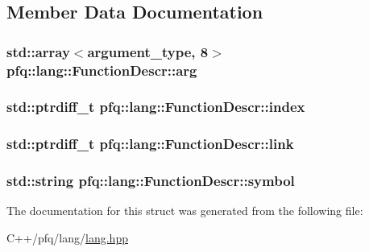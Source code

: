 \subsection{Member Data Documentation}
\hypertarget{structpfq_1_1lang_1_1FunctionDescr_af1fe3a86f26dc3f74532ce718a195006}{
\subsubsection[{arg}]{\setlength{\rightskip}{0pt plus 5cm}std\+::array$<${\bf argument\+\_\+type}, 8$>$ pfq\+::lang\+::\+Function\+Descr\+::arg}}\label{structpfq_1_1lang_1_1FunctionDescr_af1fe3a86f26dc3f74532ce718a195006}
\hypertarget{structpfq_1_1lang_1_1FunctionDescr_ae818027f48319f8f4f59d3c47202d883}{
\subsubsection[{index}]{\setlength{\rightskip}{0pt plus 5cm}std\+::ptrdiff\+\_\+t pfq\+::lang\+::\+Function\+Descr\+::index}}\label{structpfq_1_1lang_1_1FunctionDescr_ae818027f48319f8f4f59d3c47202d883}
\hypertarget{structpfq_1_1lang_1_1FunctionDescr_a09e00f9d57300893f95661b56e6b114e}{
\subsubsection[{link}]{\setlength{\rightskip}{0pt plus 5cm}std\+::ptrdiff\+\_\+t pfq\+::lang\+::\+Function\+Descr\+::link}}\label{structpfq_1_1lang_1_1FunctionDescr_a09e00f9d57300893f95661b56e6b114e}
\hypertarget{structpfq_1_1lang_1_1FunctionDescr_a21f51c65f55dddd54de1171d8914c030}{
\subsubsection[{symbol}]{\setlength{\rightskip}{0pt plus 5cm}std\+::string pfq\+::lang\+::\+Function\+Descr\+::symbol}}\label{structpfq_1_1lang_1_1FunctionDescr_a21f51c65f55dddd54de1171d8914c030}


The documentation for this struct was generated from the following file\+:\begin{DoxyCompactItemize}
\item 
C++/pfq/lang/\hyperlink{lang_8hpp}{lang.\+hpp}\end{DoxyCompactItemize}
